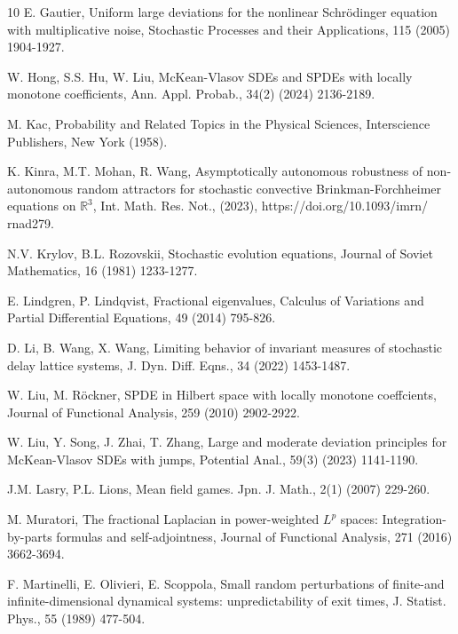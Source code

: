 \documentclass[11pt]{article}
\numberwithin{equation}{section}
\begin{document}
\begin{thebibliography}{10}
E. Gautier, Uniform large deviations for the nonlinear Schr\"{o}dinger equation with
multiplicative noise, Stochastic Processes and their Applications, 115 (2005) 1904-1927.

W. Hong, S.S. Hu, W. Liu, McKean-Vlasov SDEs and SPDEs with locally monotone
coefficients, Ann. Appl. Probab., 34(2) (2024) 2136-2189.



M. Kac, Probability and Related Topics in the Physical Sciences, Interscience Publishers,
New York (1958).



 K. Kinra, M.T. Mohan, R. Wang, Asymptotically autonomous robustness of non-autonomous random attractors for stochastic convective Brinkman-Forchheimer equations on $\mathbb {R}^3$,  Int. Math. Res. Not., (2023), https://doi.org/10.1093/imrn/ rnad279.



N.V. Krylov, B.L. Rozovskii,
Stochastic evolution equations, Journal of Soviet Mathematics, 16 (1981) 1233-1277.

E. Lindgren, P. Lindqvist, Fractional eigenvalues, Calculus of Variations and Partial Differential Equations, 49 (2014) 795-826.

D. Li, B. Wang, X. Wang,
Limiting behavior of invariant measures of stochastic delay lattice systems, J. Dyn. Diff. Eqns.,  34 (2022) 1453-1487.


W. Liu, M. R\"{o}ckner, SPDE in Hilbert space with locally monotone coeffcients, Journal of Functional Analysis,  259 (2010) 2902-2922.


W. Liu, Y. Song, J. Zhai, T. Zhang, Large and moderate deviation principles for
McKean-Vlasov SDEs with jumps, Potential Anal., 59(3) (2023) 1141-1190.


J.M. Lasry, P.L. Lions,  Mean field games. Jpn. J. Math.,  2(1) (2007) 229-260.



M. Muratori, The fractional Laplacian in power-weighted $L^p$ spaces: Integration-by-parts formulas and self-adjointness, Journal of Functional Analysis, 271 (2016) 3662-3694.


F. Martinelli, E. Olivieri, E. Scoppola, Small random perturbations of finite-and infinite-dimensional dynamical systems: unpredictability of exit times, J. Statist. Phys., 55 (1989) 477-504.



\end{thebibliography}
\end{document}
